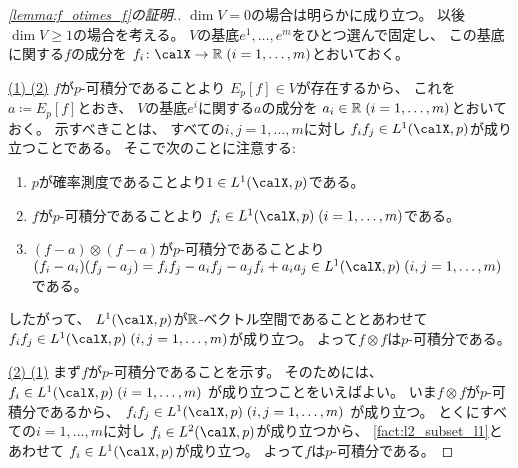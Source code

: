 \documentclass[report]{jlreq}
\begin{document}
\begin{proof}[\cref{lemma:f_otimes_f}の証明.]
    $\dim V = 0$の場合は明らかに成り立つ。
    以後$\dim V \ge 1$の場合を考える。
    $V$の基底$e^1, \dots, e^m$をひとつ選んで固定し、
    この基底に関する$f$の成分を
    $f_i \colon \calX \to \R \; (i = 1, \dots, m)$とおいておく。

    \uline{(1) \Rightarrow (2)} \quad
    $f$が$p$-可積分であることより
    $E_p[f] \in V$が存在するから、
    これを$a \coloneqq E_p[f]$とおき、
    $V$の基底$e^i$に関する$a$の成分を
    $a_i \in \mathbb{R} \; (i = 1, \dots, m)$とおいておく。
    示すべきことは、
    すべての$i, j = 1, \dots, m$に対し
    $f_i f_j \in L^1(\calX, p)$が成り立つことである。
    そこで次のことに注意する:
    \begin{enumerate}[label=(\roman*)]
        \item $p$が確率測度であることより$1 \in L^1(\calX, p)$である。
        \item $f$が$p$-可積分であることより
            $f_i \in L^1(\calX, p) \; (i = 1, \dots, m)$である。
        \item $(f - a) \otimes (f - a)$が$p$-可積分であることより
            $(f_i - a_i)(f_j - a_j)
                = f_i f_j - a_i f_j - a_j f_i + a_i a_j \in L^1(\calX, p) \;
                (i, j = 1, \dots, m)$である。
    \end{enumerate}
    したがって、
    $L^1(\calX, p)$が$\mathbb{R}$-ベクトル空間であることとあわせて
    $f_i f_j \in L^1(\calX, p) \; (i, j = 1, \dots, m)$が成り立つ。
    よって$f \otimes f$は$p$-可積分である。

    \uline{(2) \Rightarrow (1)} \quad
    まず$f$が$p$-可積分であることを示す。
    そのためには、
    $f_i \in L^1(\calX, p) \; (i = 1, \dots, m)$
    が成り立つことをいえばよい。
    いま$f \otimes f$が$p$-可積分であるから、
    $f_i f_j \in L^1(\calX, p) \; (i, j = 1, \dots, m)$
    が成り立つ。
    とくにすべての$i = 1, \dots, m$に対し
    $f_i \in L^2(\calX, p)$が成り立つから、
    \cref{fact:l2_subset_l1}とあわせて
    $f_i \in L^1(\calX, p)$が成り立つ。
    よって$f$は$p$-可積分である。


\end{proof}
\end{document}
